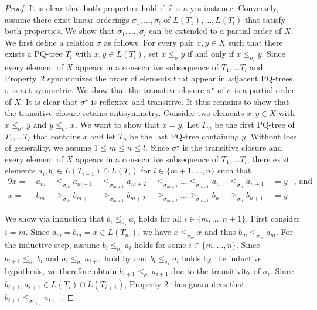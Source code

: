 \documentclass[runningheads]{llncs}
\begin{document}
\iffalse \begin{proof}
  It is clear that both properties hold if $\mathcal I$ is a yes-instance.
  Conversely, assume there exist linear orderings $\sigma_1, \dots, \sigma_l$ of $L(T_1), \dots, L(T_l)$ that satisfy both properties.
  We show that $\sigma_1, \dots, \sigma_l$ can be extended to a partial order of $X$.
  We first define a relation $\sigma$ as follows.
  For every pair $x, y \in X$ such that there exists a PQ-tree $T_i$ with $x, y \in L(T_i)$, set $x \leq_\sigma y$ if and only if $x \leq_{\sigma_i} y$.
  Since every element of $X$ appears in a consecutive subsequence of $T_1, \dots T_l$ and Property~2 synchronizes the order of elements that appear in adjacent PQ-trees,~$\sigma$ is antisymmetric.
  We show that the transitive closure $\sigma^\star$ of $\sigma$ is a partial order of $X$.
  It is clear that $\sigma^\star$ is reflexive and transitive.
  It thus remains to show that the transitive closure retains antisymmetry.
  Consider two elements $x, y \in X$ with $x \leq_{\sigma^\star} y$ and $y \leq_{\sigma^\star} x$. 
  We want to show that $x = y$.
  Let $T_m$ be the first PQ-tree of $T_1, \dots T_l$ that contains $x$ and let $T_n$ be the last PQ-tree containing $y$.
  Without loss of generality, we assume $1 \leq m \leq n \leq l$.
  Since $\sigma^\star$ is the transitive closure and every element of $X$ appears in a consecutive subsequence of $T_1, \dots T_l$, there exist elements $a_i, b_i \in L(T_{i-1}) \cap L(T_{i})$ for $i \in \{m+1, \dots, n\}$ such that
   \begin{alignat}{9}
    x =~&a_m~&\leq_{\sigma_m} a_{m+1}~&\leq_{\sigma_{m+1}} a_{m+2}~&\leq_{\sigma_{m+2}}\dots \leq_{\sigma_{n - 1}} a_{n}~&\leq_{\sigma_{n}} a_{n+1}~&= y&, \text{~and}\label{eq:1}\\
    x =~&b_m~&\geq_{\sigma_m} b_{m+1}~&\geq_{\sigma_{m+1}} b_{m+2}~&\geq_{\sigma_{m+2}}\dots \geq_{\sigma_{n - 1}} b_{n}~&\geq_{\sigma_{n}} b_{n+1}~&= y& \label{eq:2}
  \end{alignat}

  We show via induction that $b_i \leq_{\sigma_i} a_i$ holds for all $i \in \{m, \dots, n+1\}$.
  First consider $i = m$.
  Since $a_m = b_m = x \in L(T_m)$, we have $x \leq_{\sigma_m} x$ and thus $b_m \leq_{\sigma_m} a_m$.
For the inductive step, assume $b_i \leq_{\sigma_i} a_i$ holds for some $i \in \{m, \dots, n\}$.
Since $b_{i+1} \leq_{\sigma_i} b_{i}$ and $a_i \leq_{\sigma_i} a_{i+1}$ hold by  and $b_i \leq_{\sigma_i} a_i$ holds by the inductive hypothesis, we therefore obtain  $b_{i+1} \leq_{\sigma_{i}} a_{i + 1}$ due to the transitivity of $\sigma_{i}$.
  Since $b_{i+1}, a_{i+1} \in L(T_i) \cap L(T_{i+1})$, Property 2 thus guarantees that $b_{i+1} \leq_{\sigma_{i+1}} a_{i+1}$.
  

\end{proof}
\end{document}
